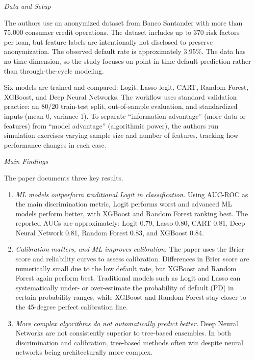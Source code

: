 \documentclass[letterpaper]{article}
\begin{document}
		\medskip
		
		\textit{Data and Setup}
		
		The authors use an anonymized dataset from Banco Santander with more than 75,000 consumer credit operations. The dataset includes up to 370 risk factors per loan, but feature labels are intentionally not disclosed to preserve anonymization. The observed default rate is approximately 3.95\%. The data has no time dimension, so the study focuses on point-in-time default prediction rather than through-the-cycle modeling.
		
		Six models are trained and compared: Logit, Lasso-logit, CART, Random Forest, XGBoost, and Deep Neural Networks. The workflow uses standard validation practice: an 80/20 train-test split, out-of-sample evaluation, and standardized inputs (mean 0, variance 1). To separate ``information advantage'' (more data or features) from ``model advantage'' (algorithmic power), the authors run simulation exercises varying sample size and number of features, tracking how performance changes in each case.
		
		\medskip
		
		\textit{Main Findings}
		
		The paper documents three key results.
		\begin{enumerate}
			\item \textit{ML models outperform traditional Logit in classification.} Using AUC-ROC as the main discrimination metric, Logit performs worst and advanced ML models perform better, with XGBoost and Random Forest ranking best. The reported AUCs are approximately: Logit 0.79, Lasso 0.80, CART 0.81, Deep Neural Network 0.81, Random Forest 0.83, and XGBoost 0.84.
			\item \textit{Calibration matters, and ML improves calibration.} The paper uses the Brier score and reliability curves to assess calibration. Differences in Brier score are numerically small due to the low default rate, but XGBoost and Random Forest again perform best. Traditional models such as Logit and Lasso can systematically under- or over-estimate the probability of default (PD) in certain probability ranges, while XGBoost and Random Forest stay closer to the 45-degree perfect calibration line.
			\item \textit{More complex algorithms do not automatically predict better.} Deep Neural Networks are not consistently superior to tree-based ensembles. In both discrimination and calibration, tree-based methods often win despite neural networks being architecturally more complex.
		\end{enumerate}
		
\end{document}
